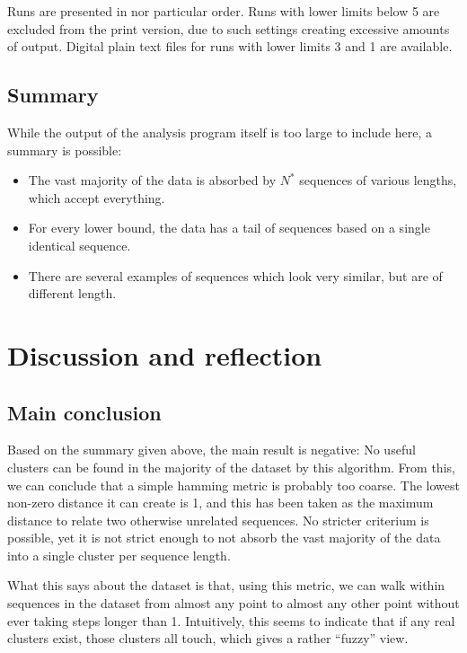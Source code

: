 \documentclass[fleqn]{book}
\providecommand{\tightlist}{%
  \setlength{\itemsep}{0pt}\setlength{\parskip}{0pt}}
\begin{document}
Runs are presented in nor particular order. Runs with lower limits below
5 are excluded from the print version, due to such settings creating
excessive amounts of output. Digital plain text files for runs with
lower limits 3 and 1 are available.

\section{Summary}\label{summary}

While the output of the analysis program itself is too large to include
here, a summary is possible:

\begin{itemize}
\tightlist
\item
  The vast majority of the data is absorbed by \(N^*\) sequences of
  various lengths, which accept everything.
\item
  For every lower bound, the data has a tail of sequences based on a
  single identical sequence.
\item
  There are several examples of sequences which look very similar, but
  are of different length.
\end{itemize}

\chapter{Discussion and reflection}\label{discussion-and-reflection}

\section{Main conclusion}\label{main-conclusion}

Based on the summary given above, the main result is negative: No useful
clusters can be found in the majority of the dataset by this algorithm.
From this, we can conclude that a simple hamming metric is probably too
coarse. The lowest non-zero distance it can create is 1, and this has
been taken as the maximum distance to relate two otherwise unrelated
sequences. No stricter criterium is possible, yet it is not strict
enough to not absorb the vast majority of the data into a single cluster
per sequence length.

What this says about the dataset is that, using this metric, we can walk
within sequences in the dataset from almost any point to almost any
other point without ever taking steps longer than 1. Intuitively, this
seems to indicate that if any real clusters exist, those clusters all
touch, which gives a rather ``fuzzy'' view.
\end{document}
